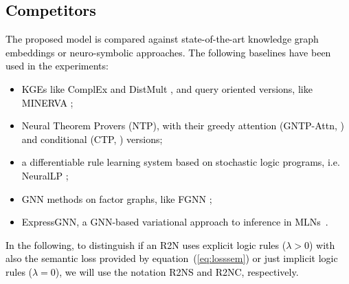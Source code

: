 \documentclass[journal]{IEEEtran}
\newcommand{\ar}[1]{\textcolor{black}{#1}}
\begin{document}
\ar{\subsection{Competitors}
The proposed model is compared against state-of-the-art knowledge graph embeddings or neuro-symbolic approaches. The following baselines have been used in the experiments:
\begin{itemize}
    \item KGEs like ComplEx \cite{trouillon2016complex} and DistMult \cite{yang2015embedding}, and query oriented versions, like MINERVA \cite{das2018gofor};
    \item Neural Theorem Provers (NTP), with their greedy attention (GNTP-Attn, \cite{minervini2018towards}) and conditional (CTP, \cite{minervini2020learning}) versions;
    \item a differentiable rule learning system based on stochastic logic programs, i.e. NeuralLP \cite{yang2017differentiable};
    \item GNN methods on factor graphs, like FGNN \cite{zhen2020nips};
    \item ExpressGNN, a GNN-based variational approach to inference in MLNs~\cite{zhang2020efficient}.
\end{itemize}
In the following, to distinguish if an R2N uses explicit logic rules ($\lambda>0$) with also the semantic loss provided by equation~(\ref{eq:losssem}) or just implicit logic rules ($\lambda=0$), we will use the notation R2NS and R2NC, respectively.}
\end{document}
